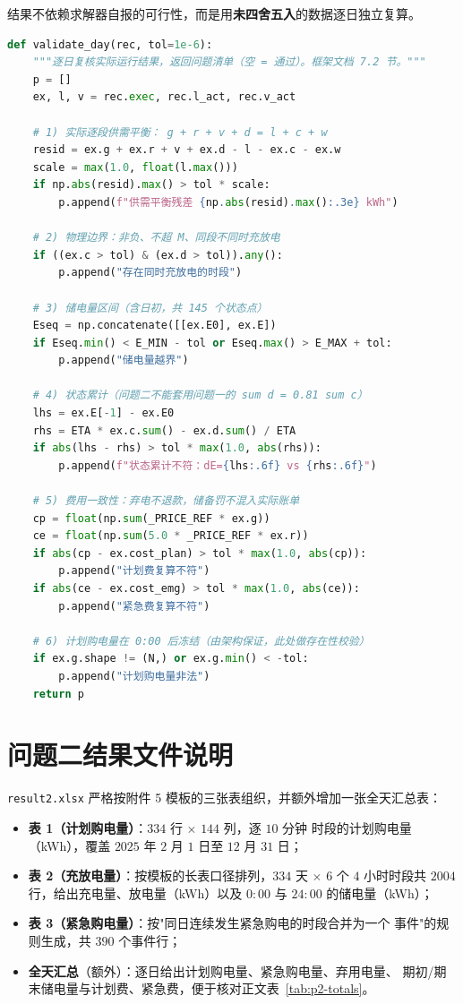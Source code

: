 \documentclass[withoutpreface,bwprint]{cumcmthesis}
\begin{document}
\begin{appendices}
结果不依赖求解器自报的可行性，而是用\textbf{未四舍五入}的数据逐日独立复算。

\begin{lstlisting}[language=Python]
def validate_day(rec, tol=1e-6):
    """逐日复核实际运行结果，返回问题清单（空 = 通过）。框架文档 7.2 节。"""
    p = []
    ex, l, v = rec.exec, rec.l_act, rec.v_act

    # 1) 实际逐段供需平衡： g + r + v + d = l + c + w
    resid = ex.g + ex.r + v + ex.d - l - ex.c - ex.w
    scale = max(1.0, float(l.max()))
    if np.abs(resid).max() > tol * scale:
        p.append(f"供需平衡残差 {np.abs(resid).max():.3e} kWh")

    # 2) 物理边界：非负、不超 M、同段不同时充放电
    if ((ex.c > tol) & (ex.d > tol)).any():
        p.append("存在同时充放电的时段")

    # 3) 储电量区间（含日初，共 145 个状态点）
    Eseq = np.concatenate([[ex.E0], ex.E])
    if Eseq.min() < E_MIN - tol or Eseq.max() > E_MAX + tol:
        p.append("储电量越界")

    # 4) 状态累计（问题二不能套用问题一的 sum d = 0.81 sum c）
    lhs = ex.E[-1] - ex.E0
    rhs = ETA * ex.c.sum() - ex.d.sum() / ETA
    if abs(lhs - rhs) > tol * max(1.0, abs(rhs)):
        p.append(f"状态累计不符：dE={lhs:.6f} vs {rhs:.6f}")

    # 5) 费用一致性：弃电不退款，储备罚不混入实际账单
    cp = float(np.sum(_PRICE_REF * ex.g))
    ce = float(np.sum(5.0 * _PRICE_REF * ex.r))
    if abs(cp - ex.cost_plan) > tol * max(1.0, abs(cp)):
        p.append("计划费复算不符")
    if abs(ce - ex.cost_emg) > tol * max(1.0, abs(ce)):
        p.append("紧急费复算不符")

    # 6) 计划购电量在 0:00 后冻结（由架构保证，此处做存在性校验）
    if ex.g.shape != (N,) or ex.g.min() < -tol:
        p.append("计划购电量非法")
    return p
\end{lstlisting}

\section{问题二结果文件说明}

\texttt{result2.xlsx} 严格按附件 5 模板的三张表组织，并额外增加一张全天汇总表：

\begin{itemize}
  \item \textbf{表 1（计划购电量）}：$334$ 行 $\times$ $144$ 列，逐 $10$ 分钟
        时段的计划购电量（kWh），覆盖 $2025$ 年 $2$ 月 $1$ 日至 $12$ 月 $31$ 日；
  \item \textbf{表 2（充放电量）}：按模板的长表口径排列，$334$ 天 $\times$
        $6$ 个 $4$ 小时时段共 $2004$ 行，给出充电量、放电量（kWh）以及
        $0{:}00$ 与 $24{:}00$ 的储电量（kWh）；
  \item \textbf{表 3（紧急购电量）}：按"同日连续发生紧急购电的时段合并为一个
        事件"的规则生成，共 $390$ 个事件行；
  \item \textbf{全天汇总}（额外）：逐日给出计划购电量、紧急购电量、弃用电量、
        期初/期末储电量与计划费、紧急费，便于核对正文表~\ref{tab:p2-totals}。
\end{itemize}


\end{appendices}
\end{document}
